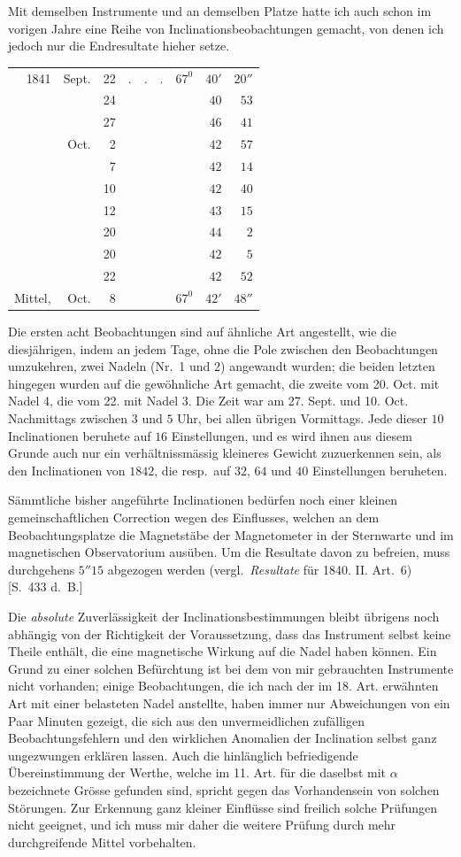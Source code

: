 Mit demselben Instrumente und an demselben Platze hatte ich auch schon im vorigen Jahre eine Reihe von Inclinationsbeobachtungen gemacht, von denen ich jedoch nur die Endresultate hieher setze.
\begin{center}
\begin{tabular}{rrrcrrr}
1841&Sept.&22&$.\quad.\quad.$&$67^0$&$40'$&$20''$\\
&&24&&&$40$&$53$\\
&&27&&&$46$&$41$\\
&Oct.&2&&&$42$&$57$\\
&&7&&&$42$&$14$\\
&&10&&&$42$&$40$\\
&&12&&&$43$&$15$\\
&&20&&&$44$&$2$\\
&&20&&&$42$&$5$\\
&&22&&&$42$&$52$\\\hline
Mittel,&Oct.&8&&$67^0$&$42'$&$48''$
\end{tabular}
\end{center}
Die ersten acht Beobachtungen sind auf ähnliche Art angestellt, wie die diesjährigen, indem an jedem Tage, ohne die Pole zwischen den Beobachtungen umzukehren, zwei Nadeln (Nr.\ 1 und 2) angewandt wurden; die beiden letzten hingegen wurden auf die gewöhnliche Art gemacht, die zweite vom 20. Oct. mit Nadel 4, die vom 22. mit Nadel 3. Die Zeit war am 27. Sept. und 10. Oct. Nachmittags zwischen $3$ und $5$ Uhr, bei allen übrigen Vormittags. Jede dieser $10$ Inclinationen beruhete auf $16$ Einstellungen, und es wird ihnen aus diesem Grunde auch nur ein verhältnissmässig kleineres Gewicht zuzuerkennen sein, als den Inclinationen von $1842$, die resp.\ auf $32$, $64$ und $40$ Einstellungen beruheten.

Sämmtliche bisher angeführte Inclinationen bedürfen noch einer kleinen gemeinschaftlichen Correction wegen des Einflusses, welchen an dem Beobachtungsplatze die Magnetstäbe der Magnetometer in der Sternwarte und im magnetischen Observatorium ausüben. Um die Resultate davon zu befreien, muss durchgehens $5''15$ abgezogen werden (vergl.\ \textit{Resultate} für 1840. II. Art.\ 6) [S.\ 433 d.\ B.]

Die \textit{absolute} Zuverlässigkeit der Inclinationsbestimmungen bleibt übrigens noch abhängig von der Richtigkeit der Voraussetzung, dass das Instrument selbst keine Theile enthält, die eine magnetische Wirkung auf die Nadel haben können. Ein Grund zu einer solchen Befürchtung ist bei dem von mir gebrauchten Instrumente nicht vorhanden; einige Beobachtungen, die ich nach der im 18. Art. erwähnten Art mit einer belasteten Nadel anstellte, haben immer nur Abweichungen von ein Paar Minuten gezeigt, die sich aus den unvermeidlichen zufälligen Beobachtungsfehlern und den wirklichen Anomalien der Inclination selbst ganz ungezwungen erklären lassen. Auch die hinlänglich befriedigende Übereinstimmung der Werthe, welche im 11. Art. für die daselbst mit $\alpha$ bezeichnete Grösse gefunden sind, spricht gegen das Vorhandensein von solchen Störungen. Zur Erkennung ganz kleiner Einflüsse sind freilich solche Prüfungen nicht geeignet, und ich muss mir daher die weitere Prüfung durch mehr durchgreifende Mittel vorbehalten.

